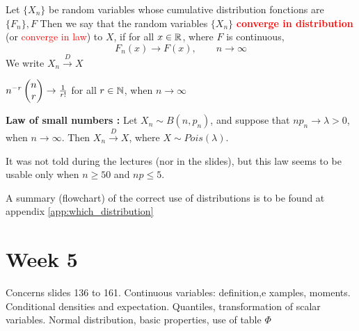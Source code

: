 \documentclass[12pt,a4paper]{article}
\begin{document}
 Let $\{X_n\}$ be random variables whose cumulative distribution fonctions are $\{F_n\},F$ Then we say that the random variables $\{X_n\}$ \textbf{\textcolor{red}{converge in distribution}} (or \textcolor{red}{converge in law}) to $X$, if for all $x \in \mathbb{R}$, where $F$ is continuous,
\begin{equation}
    F_n(x) \to F(x),\qquad n\to \infty
\end{equation}
We write $X_n \overset{D}{\longrightarrow} X$
\begin{boite}
     $n^{-r} \begin{pmatrix} n \\ r \end{pmatrix} \to \frac{1}{r!}$ for all $r\in \mathbb{N}$, when $n \to \infty$
\end{boite}
\begin{boite}
     \textbf{Law of small numbers :} Let $X_n \sim B(n,p_n)$, and suppose that $np_n \to \lambda > 0$, when $n\to \infty$. Then $X_n \overset{D}{\longrightarrow} X$, where $X \sim Pois(\lambda)$.
\end{boite}
It was not told during the lectures (nor in the slides), but this law seems to be usable only when $n \geq 50$ and $np \leq 5$. 

A summary (flowchart) of the correct use of distributions is to be found at appendix \ref{app:which_distribution}




\section{Week 5}
Concerns slides 136 to 161. Continuous variables: definition,e xamples, moments. Conditional densities and expectation. Quantiles, transformation of scalar variables. Normal distribution, basic properties, use of table $\Phi$
\end{document}
